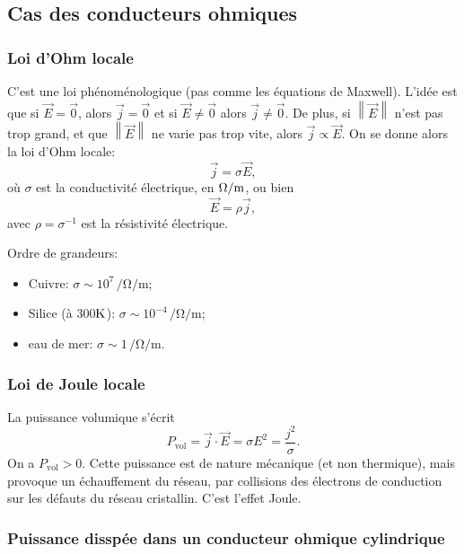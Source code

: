 \subsection{Cas des conducteurs ohmiques}
\subsubsection{Loi d'Ohm locale}

C'est une loi phénoménologique (pas comme les équations de Maxwell). L'idée est que si $\vec{E}=\vec{0}$, alors $\vec{j}=\vec{0}$ et si $\vec{E}\neq\vec{0}$ alors $\vec{j}\neq\vec{0}$. De plus, si $\left\lVert\vec{E}\right\rVert$ n'est \og pas trop grand\fg, et que $\left\lVert\vec{E}\right\rVert$ ne varie pas trop vite, alors $\vec{j}\propto\vec{E}$. On se donne alors la loi d'Ohm locale:
\begin{equation}
    \boxed{
        \vec{j}=\sigma\vec{E},
    }
\end{equation}
où $\sigma$ est la conductivité électrique, en $\si[]{\per\Omega\per\metre}$, ou bien
\begin{equation}
    \boxed{
        \vec{E}=\rho\vec{j},
    }
\end{equation}
avec $\rho=\sigma^{-1}$ est la résistivité électrique.

Ordre de grandeurs:
\begin{itemize}
    \item Cuivre: $\sigma\sim10^{7}\,\si{\per\ohm\per\metre}$;
    \item Silice (à 300$\si[]{\kelvin}$): $\sigma\sim10^{-4}\,\si{\per\ohm\per\metre}$;
    \item eau de mer: $\sigma\sim1\,\si{\per\ohm\per\metre}$.
\end{itemize}

\subsubsection{Loi de Joule locale}

La puissance volumique s'écrit
\begin{equation}
    \boxed{
        P_{\mathrm{vol}}=\vec{j}\cdot\vec{E}=\sigma E^{2}=\frac{j^{2}}{\sigma}.
    }
\end{equation}
On a $P_{\mathrm{vol}}>0$. Cette puissance est de nature mécanique (et non thermique), mais provoque un échauffement du réseau, par collisions des électrons de conduction sur les défauts du réseau cristallin. C'est l'effet Joule.

\subsubsection{Puissance disspée dans un conducteur ohmique cylindrique}

